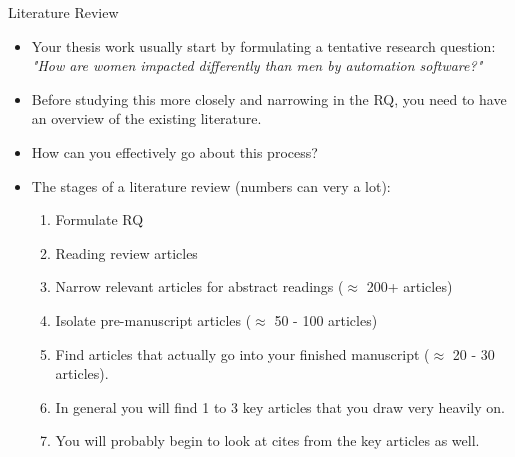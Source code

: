 \documentclass{beamer}
\begin{document}
\begin{frame}{Literature Review}
\begin{itemize}
    \item Your thesis work usually start by formulating a tentative research question: \textit{"How are women impacted differently than men by automation software?"}
    \item Before studying this more closely and narrowing in the RQ, you need to have an overview of the existing literature.
    \item How can you effectively go about this process?
    \item The stages of a literature review (numbers can very a lot):
    \begin{enumerate}
        \item Formulate RQ
        \item Reading review articles
        \item Narrow relevant articles for abstract readings ($\approx$ 200+ articles)
        \item Isolate pre-manuscript articles ($\approx$ 50 - 100 articles)
        \item Find articles that actually go into your finished manuscript ($\approx$ 20 - 30 articles).
        \item In general you will find 1 to 3 key articles that you draw very heavily on.
        \item You will probably begin to look at cites from the key articles as well.
    \end{enumerate}

\end{itemize}    
\end{frame}
\end{document}
